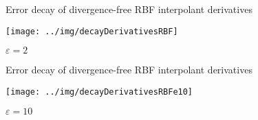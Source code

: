 \documentclass{beamer}
\begin{document}
\begin{frame}{Error decay of divergence-free RBF interpolant derivatives}
  \begin{center}
    \texttt{[image: ../img/decayDerivativesRBF]}
    
    $\varepsilon = 2$
  \end{center}
\end{frame}

\begin{frame}{Error decay of divergence-free RBF interpolant derivatives}
  \begin{center}
    \texttt{[image: ../img/decayDerivativesRBFe10]}
    
    $\varepsilon = 10$
  \end{center}
\end{frame}
\end{document}
